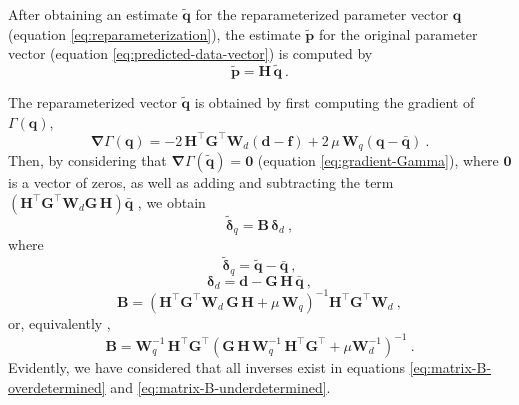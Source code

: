 After obtaining an estimate $\tilde{\mathbf{q}}$ for the reparameterized parameter vector $\mathbf{q}$ (equation \ref{eq:reparameterization}), 
the estimate $\tilde{\mathbf{p}}$ for the original parameter vector 
(equation \ref{eq:predicted-data-vector}) is computed by 
\begin{equation}
	\tilde{\mathbf{p}} = \mathbf{H} \, \tilde{\mathbf{q}} \: .
	\label{eq:vector-p-tilde}
\end{equation}

The reparameterized vector $\tilde{\mathbf{q}}$ is obtained by first computing the gradient of $\Gamma(\mathbf{q})$,
\begin{equation}
	\boldsymbol{\nabla} \Gamma(\mathbf{q}) = 
	-2 \, \mathbf{H}^{\top}\mathbf{G}^{\top} \mathbf{W}_{d} \left(\mathbf{d} - \mathbf{f} \right) +
	2 \, \mu \, \mathbf{W}_{q} \left( \mathbf{q} - \bar{\mathbf{q}} \right) \: .
	\label{eq:gradient-Gamma}
\end{equation}
Then, by considering that $\boldsymbol{\nabla} \Gamma(\tilde{\mathbf{q}}) = \mathbf{0}$ (equation \ref{eq:gradient-Gamma}),
where $\mathbf{0}$ is a vector of zeros, as well as adding and subtracting the term
$\left( \mathbf{H}^{\top}\mathbf{G}^{\top}\mathbf{W}_{d} \mathbf{G} \, \mathbf{H} \right) \bar{\mathbf{q}}$ ,
we obtain
\begin{equation}
	\tilde{\boldsymbol{\delta}}_{q} = \mathbf{B} \, \boldsymbol{\delta}_{d} \: ,
	\label{eq:vector-q-tilde}
\end{equation}
where 
\begin{equation}
	\tilde{\boldsymbol{\delta}}_{q} = \tilde{\mathbf{q}} - \bar{\mathbf{q}} \: ,
	\label{eq:delta-q-tilde}
\end{equation}
\begin{equation}
	\boldsymbol{\delta}_{d} = \mathbf{d} - \mathbf{G} \, \mathbf{H} \, \bar{\mathbf{q}} \: ,
	\label{eq:delta-d}
\end{equation}
\begin{equation}
	\mathbf{B} = \left( \mathbf{H}^{\top} \mathbf{G}^{\top} \mathbf{W}_{d} \, \mathbf{G} \, \mathbf{H} + 
	\mu \, \mathbf{W}_{q} \right)^{-1}
	\mathbf{H}^{\top} \mathbf{G}^{\top} \mathbf{W}_{d} \: ,
	\label{eq:matrix-B-overdetermined}
\end{equation}
or, equivalently \cite[][p. 62]{menke2018},
\begin{equation}
	\mathbf{B} = \mathbf{W}_{q}^{-1} \, \mathbf{H}^{\top} \mathbf{G}^{\top}
	\left( \mathbf{G} \, \mathbf{H} \, \mathbf{W}_{q}^{-1} \,
	\mathbf{H}^{\top}\mathbf{G}^{\top} + \mu \mathbf{W}_{d}^{-1} \right)^{-1} \: .
	\label{eq:matrix-B-underdetermined}
\end{equation}
Evidently, we have considered that all inverses exist in equations \ref{eq:matrix-B-overdetermined} and \ref{eq:matrix-B-underdetermined}.

